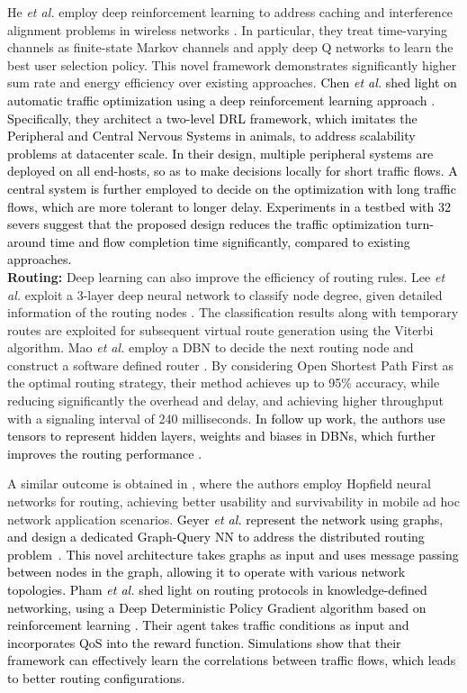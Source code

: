 \documentclass[journal,comsoc,letter]{IEEEtran}
\newcommand{\edit}[1]{\textcolor{black}{#1}}
\newcommand{\rev}[1]{\textcolor{black}{#1}}
\begin{document}
He \emph{et al.} employ deep reinforcement learning to address caching and interference alignment problems in wireless networks \cite{he2017optimization, he2017deep3}. In particular, they treat time-varying channels as finite-state Markov channels and apply deep Q networks to learn the best user selection policy. This novel framework demonstrates significantly higher sum rate and energy efficiency over existing approaches. \edit{Chen \emph{et al.} shed light on automatic traffic optimization using a deep reinforcement learning approach \cite{chen2018auto}. Specifically, they architect a two-level DRL framework, which imitates the Peripheral and Central Nervous Systems in animals, to address scalability problems at datacenter scale. In their design, multiple peripheral systems are deployed on all end-hosts, so as to make decisions locally for short traffic flows. A central system is further employed to decide on the optimization with long traffic flows, which are more tolerant to longer delay. Experiments in a testbed with 32 severs suggest that the proposed design  reduces the traffic optimization turn-around time and flow completion time significantly, compared to existing approaches.}\\


\noindent\textbf{Routing:} Deep learning can also improve the efficiency of routing rules. Lee \emph{et al.} exploit a 3-layer deep neural network to classify node degree, given detailed information of the routing nodes \cite{lee2017classification}. The classification results along with temporary routes are exploited for subsequent virtual route generation using the Viterbi algorithm.  Mao \emph{et al.} employ a DBN to decide the next routing node and construct a software defined router \cite{mao2017routing}. By considering Open Shortest Path First as the optimal routing strategy, their method achieves up to 95\% accuracy, while reducing significantly the overhead and delay, and achieving higher throughput with a signaling interval of 240 milliseconds. \rev{In follow up work, the authors use tensors to represent hidden layers, weights and biases in DBNs, which further improves the routing performance \cite{mao2017tensor}.} 

A similar outcome is obtained in \cite{yang2017neural}, where the authors employ Hopfield neural networks for routing, achieving better usability and survivability in mobile ad hoc network application scenarios. \rev{Geyer \emph{et al.} represent the network using graphs, and design a dedicated Graph-Query NN to address the distributed routing problem~\cite{geyer2018learning}. This novel architecture takes graphs as input and uses message passing between nodes in the graph, allowing it to operate with various network topologies. Pham \emph{et al.} shed light on routing protocols in knowledge-defined networking, using a Deep Deterministic Policy Gradient algorithm based on reinforcement learning \cite{pham2018deep}. Their agent takes traffic conditions as input and incorporates QoS into the reward function. Simulations show that their framework can effectively learn the correlations between traffic flows, which leads to better routing configurations.}\\
\end{document}
